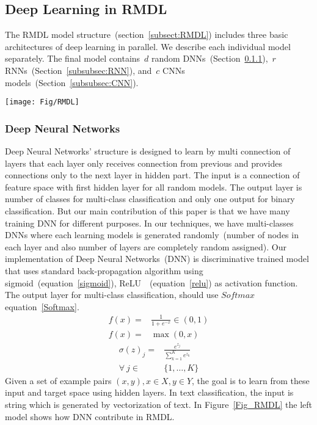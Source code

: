 \documentclass[sigconf, final]{acmart}
\begin{document}
\subsection{Deep Learning in RMDL}\label{subsec:Deep_learning}
The RMDL model structure~(section~\ref{subsect:RMDL}) includes three basic architectures of deep learning in parallel. We describe each individual model separately. The final model contains~$d$ random DNNs~(Section~\ref{subsubsec:DNN}),~$r$ RNNs~(Section~\ref{subsubsec:RNN}), and~$c$ CNNs models~(Section~\ref{subsubsec:CNN}).
\begin{figure*}[t]
\centering
\texttt{[image: Fig/RMDL]}
\caption{\underline{R}andom \underline{M}ultimodel \underline{D}eep \underline{L}earning~(RDML) architecture for classification which includes~$3$ Random models, a DNN classifier at left, a Deep CNN classifier at middle, and a Deep RNN classifier at right~(each unit could be LSTM or GRU).}
\vspace{-0.15in}
\label{Fig_RMDL}

\end{figure*}\subsubsection{Deep Neural Networks}\label{subsubsec:DNN}
Deep Neural Networks' structure is designed to learn by multi connection of layers that each layer only receives connection from previous and provides connections only to the next layer in hidden part. The input is a connection of feature space with first hidden layer for all random models. The output layer is number of classes for multi-class classification and only one output for binary classification. But our main contribution of this paper is that we have many training DNN for different purposes. In our techniques, we have multi-classes DNNs where each learning models is generated randomly~(number of nodes in each layer and also number of layers are completely random assigned). Our implementation of Deep Neural Networks~(DNN) is discriminative trained model that uses standard back-propagation algorithm using sigmoid~(equation~\ref{sigmoid}), ReLU~\cite{nair2010rectified}~(equation~\ref{relu}) as activation function. The output layer for multi-class classification, should use $Softmax$ equation~\ref{Softmax}.
\begin{align}
\label{sigmoid}
f(x) =& \frac{1}{1+e^{-x}}\in (0,1)\\
\label{relu}
f(x) =& \max(0,x)
\end{align}\begin{align}
\label{Softmax}
\sigma(z)_j =& \frac{e^{z_j}}{\sum_{k=1}^K e^{z_k}}\\ 
\forall   ~j \in &\{1,\hdots, K\} \nonumber
\end{align}
 Given a set of example pairs $(x,y),x\in X,y\in Y$, the goal is to learn from these input and target space using hidden layers. In text classification, the input is string which is generated by vectorization of text. In Figure~\ref{Fig_RMDL} the left model shows how DNN contribute in RMDL.
\end{document}
